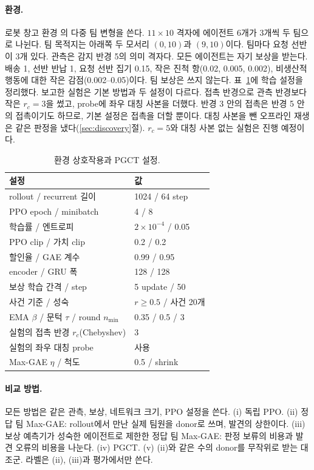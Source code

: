\documentclass[10pt,twocolumn,letterpaper]{article}
\begin{document}
\paragraph{환경.} 로봇 창고 환경 \citep{benchmark}의 다중 팀 변형을 쓴다. $11\times10$ 격자에 에이전트 6개가 3개씩 두 팀으로 나뉜다. 팀 목적지는 아래쪽 두 모서리 $(0,10)$과 $(9,10)$이다. 팀마다 요청 선반이 3개 있다. 관측은 감지 반경 5의 의미 격자다. 모든 에이전트는 자기 보상을 받는다. 배송 1, 선반 반납 1, 요청 선반 집기 0.15, 작은 진척 항(0.02, 0.005, 0.002), 비생산적 행동에 대한 작은 감점(0.002--0.05)이다. 팀 보상은 쓰지 않는다. 표~\ref{tab:settings}에 학습 설정을 정리했다. 보고한 실험은 기본 방법과 두 설정이 다르다. 접촉 반경으로 관측 반경보다 작은 $r_c=3$을 썼고, probe에 좌우 대칭 사본을 더했다. 반경 3 안의 접촉은 반경 5 안의 접촉이기도 하므로, 기본 설정은 접촉을 더할 뿐이다. 대칭 사본을 뺀 오프라인 재생은 같은 판정을 냈다(\ref{sec:discovery}절). $r_c=5$와 대칭 사본 없는 실험은 진행 예정이다.

\begin{table}[t]\centering\small
\begin{tabular}{ll}\toprule
설정 & 값\\\midrule
rollout / recurrent 길이 & 1024 / 64 step\\
PPO epoch / minibatch & 4 / 8\\
학습률 / 엔트로피 & $2\times10^{-4}$ / 0.05\\
PPO clip / 가치 clip & 0.2 / 0.2\\
할인율 / GAE 계수 & 0.99 / 0.95\\
encoder / GRU 폭 & 128 / 128\\
보상 학습 간격 / step & 5 update / 50\\
사건 기준 / 성숙 & $r\ge0.5$ / 사건 20개\\
EMA $\beta$ / 문턱 $\tau$ / round $n_{\min}$ & 0.35 / 0.5 / 3\\
실험의 접촉 반경 $r_c$(Chebyshev) & 3\\
실험의 좌우 대칭 probe & 사용\\
Max-GAE $\eta$ / 척도 & 0.5 / shrink\\\bottomrule
\end{tabular}
\caption{환경 상호작용과 PGCT 설정.}\label{tab:settings}
\end{table}

\paragraph{비교 방법.} 모든 방법은 같은 관측, 보상, 네트워크 크기, PPO 설정을 쓴다. (i) 독립 PPO. (ii) 정답 팀 Max-GAE: rollout에서 만난 실제 팀원을 donor로 쓰며, 발견의 상한이다. (iii) 보상 예측기가 성숙한 에이전트로 제한한 정답 팀 Max-GAE: 판정 보류의 비용과 발견 오류의 비용을 나눈다. (iv) PGCT. (v) (ii)와 같은 수의 donor를 무작위로 받는 대조군. 라벨은 (ii), (iii)과 평가에서만 쓴다.
\end{document}
